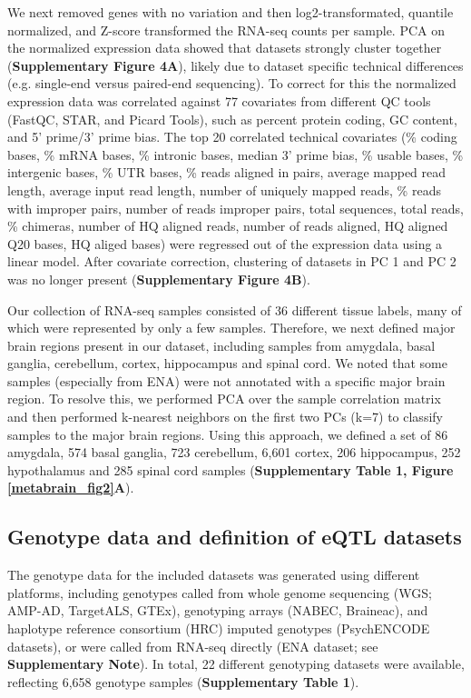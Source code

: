 We next removed genes with no variation and then log2-transformated, quantile normalized, and Z-score transformed the RNA-seq counts per sample. PCA on the normalized expression data showed that datasets strongly cluster together (\textbf{Supplementary Figure 4A}), likely due to dataset specific technical differences (e.g. single-end versus paired-end sequencing). To correct for this the normalized expression data was correlated against 77 covariates from different QC tools (FastQC\cite{BabrahamBioinformaticsFastQC}, STAR\cite{dobinSTARUltrafastUniversal2013}, and Picard Tools\cite{broadinstitutePicardTools2019}), such as percent protein coding, GC content, and 5’ prime/3’ prime bias. The top 20 correlated technical covariates (\% coding bases, \% mRNA bases, \% intronic bases, median 3’ prime bias, \% usable bases, \% intergenic bases, \% UTR bases, \% reads aligned in pairs, average mapped read length, average input read length, number of uniquely mapped reads, \% reads with improper pairs, number of reads improper pairs, total sequences, total reads, \% chimeras, number of HQ aligned reads, number of reads aligned, HQ aligned Q20 bases, HQ aliged bases) were regressed out of the expression data using a linear model. After covariate correction, clustering of datasets in PC 1 and PC 2 was no longer present (\textbf{Supplementary Figure 4B}).  

Our collection of RNA-seq samples consisted of 36 different tissue labels, many of which were represented by only a few samples. Therefore, we next defined major brain regions present in our dataset, including samples from amygdala, basal ganglia, cerebellum, cortex, hippocampus and spinal cord. We noted that some samples (especially from ENA) were not annotated with a specific major brain region. To resolve this, we performed PCA over the sample correlation matrix and then performed k-nearest neighbors on the first two PCs (k=7) to classify samples to the major brain regions. Using this approach, we defined a set of 86 amygdala, 574 basal ganglia, 723 cerebellum, 6,601 cortex, 206 hippocampus, 252 hypothalamus and 285 spinal cord samples (\textbf{Supplementary Table 1, Figure \ref{metabrain_fig2}A}). 

\subsection{Genotype data and definition of eQTL datasets}
The genotype data for the included datasets was generated using different platforms, including genotypes called from whole genome sequencing (WGS; AMP-AD, TargetALS\cite{prudencioDistinctBrainTranscriptome2015}, GTEx\cite{consortiumGTExConsortiumAtlas2020}), genotyping arrays (NABEC\cite{gibbsAbundantQuantitativeTrait2010}, Braineac\cite{ramasamyGeneticVariabilityRegulation2014}), and haplotype reference consortium (HRC)\cite{mccarthyReferencePanel642016} imputed genotypes (PsychENCODE datasets), or were called from RNA-seq directly (ENA dataset; see \textbf{Supplementary Note}). In total, 22 different genotyping datasets were available, reflecting 6,658 genotype samples (\textbf{Supplementary Table 1}).  

